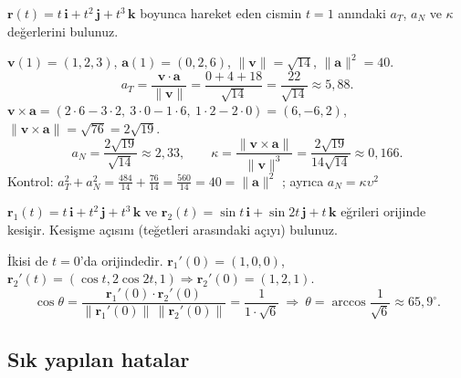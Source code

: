 \begin{soru}
$\mathbf r(t)=t\,\mathbf i+t^2\,\mathbf j+t^3\,\mathbf k$ boyunca hareket eden cismin $t=1$ anındaki $a_T$, $a_N$ ve $\kappa$ değerlerini bulunuz.
\end{soru}
\begin{cevap}
$\mathbf v(1)=(1,2,3)$, $\mathbf a(1)=(0,2,6)$, $\|\mathbf v\|=\sqrt{14}$, $\|\mathbf a\|^2=40$.
\[ a_T=\frac{\mathbf v\cdot\mathbf a}{\|\mathbf v\|}=\frac{0+4+18}{\sqrt{14}}=\frac{22}{\sqrt{14}}\approx5{,}88 . \]
$\mathbf v\times\mathbf a=(2\cdot6-3\cdot2,\ 3\cdot0-1\cdot6,\ 1\cdot2-2\cdot0)=(6,-6,2)$, \ $\|\mathbf v\times\mathbf a\|=\sqrt{76}=2\sqrt{19}$.
\[ a_N=\frac{2\sqrt{19}}{\sqrt{14}}\approx2{,}33,\qquad \kappa=\frac{\|\mathbf v\times\mathbf a\|}{\|\mathbf v\|^3}=\frac{2\sqrt{19}}{14\sqrt{14}}\approx0{,}166 . \]
Kontrol: $a_T^2+a_N^2=\frac{484}{14}+\frac{76}{14}=\frac{560}{14}=40=\|\mathbf a\|^2$ \checkmark; ayrıca $a_N=\kappa\upsilon^2$ \checkmark
\end{cevap}

\begin{soru}
$\mathbf r_1(t)=t\,\mathbf i+t^2\,\mathbf j+t^3\,\mathbf k$ ve $\mathbf r_2(t)=\sin t\,\mathbf i+\sin2t\,\mathbf j+t\,\mathbf k$ eğrileri orijinde
kesişir. Kesişme açısını (teğetleri arasındaki açıyı) bulunuz.
\end{soru}
\begin{cevap}
İkisi de $t=0$'da orijindedir. $\mathbf r_1'(0)=(1,0,0)$, $\mathbf r_2'(t)=(\cos t,2\cos2t,1)\Rightarrow\mathbf r_2'(0)=(1,2,1)$.
\[ \cos\theta=\frac{\mathbf r_1'(0)\cdot\mathbf r_2'(0)}{\|\mathbf r_1'(0)\|\,\|\mathbf r_2'(0)\|}=\frac{1}{1\cdot\sqrt6}\ \Rightarrow\ \theta=\arccos\frac1{\sqrt6}\approx65{,}9^\circ . \]
\end{cevap}

\subsection{Sık yapılan hatalar}

